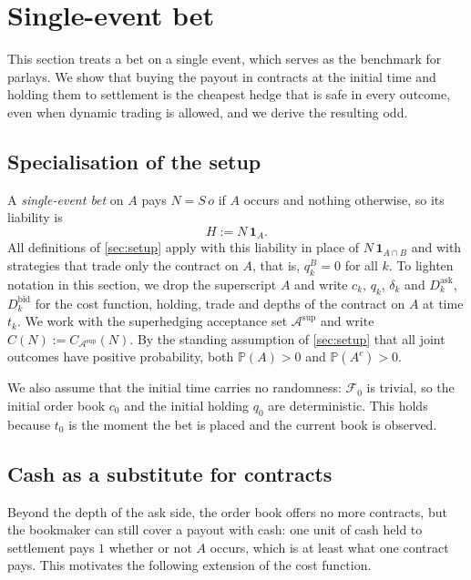 \documentclass[11pt,a4paper]{article}
\theoremstyle{plain}
\theoremstyle{definition}
\theoremstyle{remark}
\newcommand{\Prob}{\mathbb{P}}
\newcommand{\1}{\mathbf{1}}
\newcommand{\F}{\mathcal{F}}
\begin{document}
\section{Single-event bet}
\label{sec:single}
This section treats a bet on a single event, which serves as the benchmark for parlays. We show that buying the payout in contracts at the initial time and holding them to settlement is the cheapest hedge that is safe in every outcome, even when dynamic trading is allowed, and we derive the resulting odd.

\subsection{Specialisation of the setup}

A \emph{single-event bet} on $A$ pays $N = S\,o$ if $A$ occurs and nothing otherwise, so its liability is
\[
H := N\,\1_A.
\]
All definitions of \cref{sec:setup} apply with this liability in place of $N\,\1_{A\cap B}$ and with strategies that trade only the contract on $A$, that is, $q^B_k = 0$ for all $k$. To lighten notation in this section, we drop the superscript $A$ and write $c_k$, $q_k$, $\delta_k$ and $D^{\mathrm{ask}}_k$, $D^{\mathrm{bid}}_k$ for the cost function, holding, trade and depths of the contract on $A$ at time $t_k$. We work with the superhedging acceptance set $\mathcal{A}^{\mathrm{sup}}$ and write $C(N) := C_{\mathcal{A}^{\mathrm{sup}}}(N)$. By the standing assumption of \cref{sec:setup} that all joint outcomes have positive probability, both $\Prob(A)>0$ and $\Prob(A^c)>0$.

We also assume that the initial time carries no randomness: $\F_0$ is trivial, so the initial order book $c_0$ and the initial holding $q_0$ are deterministic. This holds because $t_0$ is the moment the bet is placed and the current book is observed.

\subsection{Cash as a substitute for contracts}

Beyond the depth of the ask side, the order book offers no more contracts, but the bookmaker can still cover a payout with cash: one unit of cash held to settlement pays $1$ whether or not $A$ occurs, which is at least what one contract pays. This motivates the following extension of the cost function.
\end{document}
